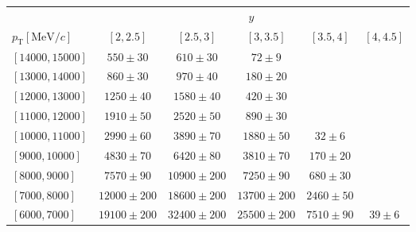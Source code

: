 \renewcommand{\arraystretch}{1.0}
\begin{tabular}{lr@{\hskip+0.2em}c@{\hskip+0.2em}r@{\hskip+0.2em}c@{\hskip+0.2em}rr@{\hskip+0.2em}c@{\hskip+0.2em}r@{\hskip+0.2em}c@{\hskip+0.2em}rr@{\hskip+0.2em}c@{\hskip+0.2em}r@{\hskip+0.2em}c@{\hskip+0.2em}rr@{\hskip+0.2em}c@{\hskip+0.2em}r@{\hskip+0.2em}c@{\hskip+0.2em}rr@{\hskip+0.2em}c@{\hskip+0.2em}r@{\hskip+0.2em}c@{\hskip+0.2em}r}
\toprule&\multicolumn{25}{c}{$y$}\\
$p_{\text{T}} [\text{MeV}/c]$ & \multicolumn{5}{c}{$[2,2.5]$} & \multicolumn{5}{c}{$[2.5,3]$} & \multicolumn{5}{c}{$[3,3.5]$} & \multicolumn{5}{c}{$[3.5,4]$} & \multicolumn{5}{c}{$[4,4.5]$} \\
\midrule$[14000,15000]$ & \multicolumn{5}{c}{$550 \pm 30$} & \multicolumn{5}{c}{$610 \pm 30$} & \multicolumn{5}{c}{$72 \pm 9$} & \multicolumn{5}{c}{ } & \multicolumn{5}{c}{ } \\
$[13000,14000]$ & \multicolumn{5}{c}{$860 \pm 30$} & \multicolumn{5}{c}{$970 \pm 40$} & \multicolumn{5}{c}{$180 \pm 20$} & \multicolumn{5}{c}{ } & \multicolumn{5}{c}{ } \\
$[12000,13000]$ & \multicolumn{5}{c}{$1250 \pm 40$} & \multicolumn{5}{c}{$1580 \pm 40$} & \multicolumn{5}{c}{$420 \pm 30$} & \multicolumn{5}{c}{ } & \multicolumn{5}{c}{ } \\
$[11000,12000]$ & \multicolumn{5}{c}{$1910 \pm 50$} & \multicolumn{5}{c}{$2520 \pm 50$} & \multicolumn{5}{c}{$890 \pm 30$} & \multicolumn{5}{c}{ } & \multicolumn{5}{c}{ } \\
$[10000,11000]$ & \multicolumn{5}{c}{$2990 \pm 60$} & \multicolumn{5}{c}{$3890 \pm 70$} & \multicolumn{5}{c}{$1880 \pm 50$} & \multicolumn{5}{c}{$32 \pm 6$} & \multicolumn{5}{c}{ } \\
$[9000,10000]$ & \multicolumn{5}{c}{$4830 \pm 70$} & \multicolumn{5}{c}{$6420 \pm 80$} & \multicolumn{5}{c}{$3810 \pm 70$} & \multicolumn{5}{c}{$170 \pm 20$} & \multicolumn{5}{c}{ } \\
$[8000,9000]$ & \multicolumn{5}{c}{$7570 \pm 90$} & \multicolumn{5}{c}{$10900 \pm 200$} & \multicolumn{5}{c}{$7250 \pm 90$} & \multicolumn{5}{c}{$680 \pm 30$} & \multicolumn{5}{c}{ } \\
$[7000,8000]$ & \multicolumn{5}{c}{$12000 \pm 200$} & \multicolumn{5}{c}{$18600 \pm 200$} & \multicolumn{5}{c}{$13700 \pm 200$} & \multicolumn{5}{c}{$2460 \pm 50$} & \multicolumn{5}{c}{ } \\
$[6000,7000]$ & \multicolumn{5}{c}{$19100 \pm 200$} & \multicolumn{5}{c}{$32400 \pm 200$} & \multicolumn{5}{c}{$25500 \pm 200$} & \multicolumn{5}{c}{$7510 \pm 90$} & \multicolumn{5}{c}{$39 \pm 6$} \\

\end{tabular}
